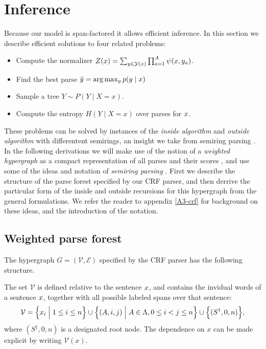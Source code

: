\section{Inference}
  \label{sect:inference}
  Because our model is span-factored it allows efficient inference. In this section we describe efficient solutions to four related problems:
  \begin{itemize}
    \item Compute the normalizer $Z(x) = \sum_{ y \in \mathcal{Y}(x) } \prod_{ a=1 }^{ A } \psi( x, y_a )$.
    \item Find the best parse $\hat{ y } = \arg \max_{y } p(y  \mid x)$
    \item Sample a tree $Y \sim P(Y \mid X = x)$. %
    \item Compute the entropy $H(Y \mid X = x)$ over parses for $x$.
  \end{itemize}
  These problems can be solved by instances of the \textit{inside algorithm} and \textit{outside algorithm} \citep{baker1979trainable} with differentent semirings, an insight we take from semiring parsing \citep{goodman1999semiring}. In the following derivations we will make use of the notion of a \textit{weighted hypergraph} as a compact representation of all parses and their scores \citep{gallo1993directed,klein2004parsing}, and use some of the ideas and notation of \textit{semiring parsing} \citep{goodman1999semiring,eisner2009semirings}. First we describe the structure of the parse forest specified by our CRF parser, and then derrive the particular form of the inside and outside recursions for this hypergraph from the general formulations. We refer the reader to appendix \ref{A3-crf} for background on these ideas, and the introduction of the notation.

\subsection{Weighted parse forest}
  The hypergraph $G = (\mathcal{V}, \mathcal{E})$ specified by the CRF parser has the following structure.

  The set $\mathcal{V}$ is defined relative to the sentence $x$, and contains the invidual words of a sentence $x$, together with all possible labeled spans over that sentence:
  \begin{align*}
    \mathcal{V} = \Big\{ x_i \; \Big\vert \; 1 \leq i \leq n \Big\} \cup \Big\{ (A, i, j) \; \Big\vert \; A \in \Lambda, 0 \leq i < j \leq n \Big\} \cup \Big\{ (S^{\dagger}, 0, n) \Big\},
  \end{align*}
  where $(S^{\dagger}, 0, n)$ is a designated root node. The dependence on $x$ can be made explicit by writing $\mathcal{V}(x)$.

